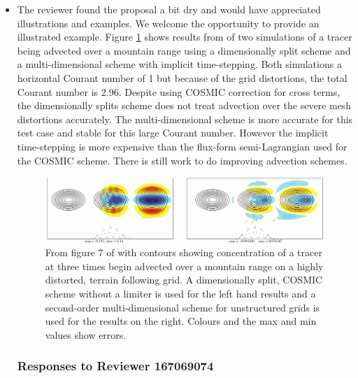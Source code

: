\begin{itemize}
\item
The reviewer found the proposal a bit dry and would have appreciated illustrations and examples. We welcome the opportunity to provide an illustrated example. Figure \ref{fig:CWPS17_fig7} shows results from \cite{CWPS17} of two simulations of a tracer being advected over a mountain range using a dimensionally split scheme and a multi-dimensional scheme with implicit time-stepping. Both simulations a horizontal Courant number of 1 but because of the grid distortions, the total Courant number is 2.96. Despite using COSMIC correction for cross terms, the dimensionally splits scheme does not treat advection over the severe mesh distortions accurately. The multi-dimensional scheme is more accurate for this test case and stable for this large Courant number. However the implicit time-stepping is more expensive than the flux-form semi-Lagrangian used for the COSMIC scheme. There is still work to do improving advection schemes.

\begin{figure}
\includegraphics[width=\linewidth]{ChenFig7.png}
\caption{From figure 7 of \cite{CWPS17} with contours showing concentration of a tracer at three times begin advected over a mountain range on a highly distorted, terrain following grid. A dimensionally split, COSMIC scheme without a limiter is used for the left hand results and a second-order multi-dimensional scheme for unstructured grids is used for the results on the right. Colours and the max and min values show errors.}
\label{fig:CWPS17_fig7}
\end{figure}


\subsubsection*{Responses to Reviewer 167069074}



\end{itemize}
\renewcommand{\refname}{References}




